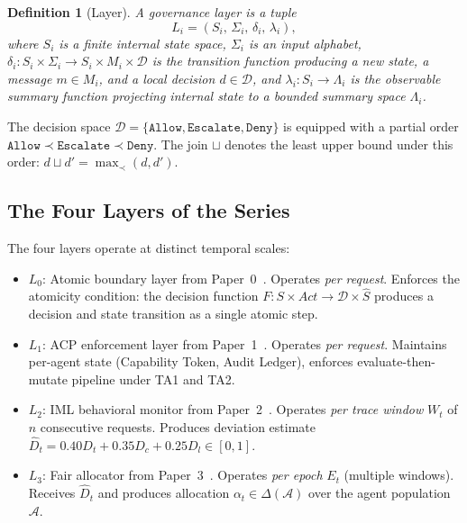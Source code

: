 \documentclass[11pt]{article}
\newtheorem{definition}[theorem]{Definition}
\newcommand{\Agents}{\mathcal{A}}
\newcommand{\Dec}{\mathcal{D}}
\newcommand{\Dhat}{\widehat{D}}
\newcommand{\allow}{\texttt{Allow}}
\newcommand{\deny}{\texttt{Deny}}
\newcommand{\escalate}{\texttt{Escalate}}
\newcommand{\Layer}[1]{L_{#1}}
\newcommand{\State}[1]{S_{#1}}
\newcommand{\Trans}[1]{\delta_{#1}}
\newcommand{\Sum}[1]{\lambda_{#1}}
\newcommand{\join}{\sqcup}
\begin{document}
\begin{definition}[Layer]
\label{def:layer}
A \emph{governance layer} is a tuple
\[
  \Layer{i} = (\State{i},\, \Sigma_i,\, \Trans{i},\, \Sum{i}),
\]
where $\State{i}$ is a finite internal state space, $\Sigma_i$ is an input
alphabet, $\Trans{i}: \State{i} \times \Sigma_i \to \State{i} \times M_i
\times \Dec$ is the transition function producing a new state, a message
$m \in M_i$, and a local decision $d \in \Dec$, and
$\Sum{i}: \State{i} \to \Lambda_i$ is the \emph{observable summary} function
projecting internal state to a bounded summary space $\Lambda_i$.
\end{definition}

The decision space $\Dec = \{\allow, \escalate, \deny\}$ is equipped with a
partial order $\allow \prec \escalate \prec \deny$. The join $\join$ denotes
the least upper bound under this order: $d \join d' = \max_\prec(d, d')$.

\subsection{The Four Layers of the Series}

The four layers operate at distinct temporal scales:

\begin{itemize}[noitemsep]
  \item $\Layer{0}$: Atomic boundary layer from Paper~0~\cite{fernandez2026a}.
    Operates \emph{per request}. Enforces the atomicity condition: the decision
    function $F: S \times \mathit{Act} \to \Dec \times \hat{S}$ produces
    a decision and state transition as a single atomic step.
  \item $\Layer{1}$: ACP enforcement layer from
    Paper~1~\cite{fernandez2026b}. Operates \emph{per request}. Maintains
    per-agent state (Capability Token, Audit Ledger), enforces evaluate-then-mutate
    pipeline under TA1 and TA2.
  \item $\Layer{2}$: IML behavioral monitor from
    Paper~2~\cite{fernandez2026c}. Operates \emph{per trace window} $W_t$ of
    $n$ consecutive requests. Produces deviation estimate
    $\Dhat_t = 0.40 D_t + 0.35 D_c + 0.25 D_l \in [0,1]$.
  \item $\Layer{3}$: Fair allocator from
    Paper~3~\cite{fairgov26}. Operates \emph{per epoch} $E_t$
    (multiple windows). Receives $\Dhat_t$ and produces allocation
    $\alpha_t \in \Delta(\Agents)$ over the agent population $\Agents$.
\end{itemize}
\end{document}
